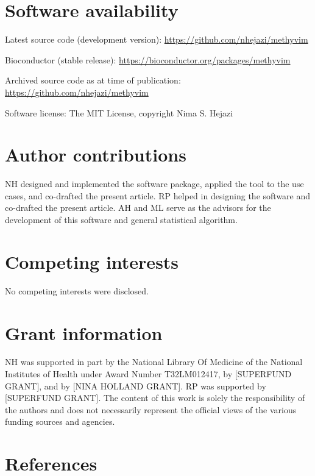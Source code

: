 \documentclass[9pt,a4paper,]{extarticle}
\theoremstyle{definition}
\theoremstyle{definition}
\theoremstyle{definition}
\theoremstyle{remark}
\begin{document}
\section{Software availability}\label{software-availability}

Latest source code (development version):
\url{https://github.com/nhejazi/methyvim}

Bioconductor (stable release):
\url{https://bioconductor.org/packages/methyvim}

Archived source code as at time of publication:
\url{https://github.com/nhejazi/methyvim}

Software license: The MIT License, copyright Nima S. Hejazi

\section{Author contributions}\label{author-contributions}

NH designed and implemented the software package, applied the tool to
the use cases, and co-drafted the present article. RP helped in
designing the software and co-drafted the present article. AH and ML
serve as the advisors for the development of this software and general
statistical algorithm.

\section{Competing interests}\label{competing-interests}

No competing interests were disclosed.

\section{Grant information}\label{grant-information}

NH was supported in part by the National Library Of Medicine of the
National Institutes of Health under Award Number T32LM012417, by
{[}SUPERFUND GRANT{]}, and by {[}NINA HOLLAND GRANT{]}. RP was supported
by {[}SUPERFUND GRANT{]}. The content of this work is solely the
responsibility of the authors and does not necessarily represent the
official views of the various funding sources and agencies.

\section*{References}\label{references}
\end{document}
